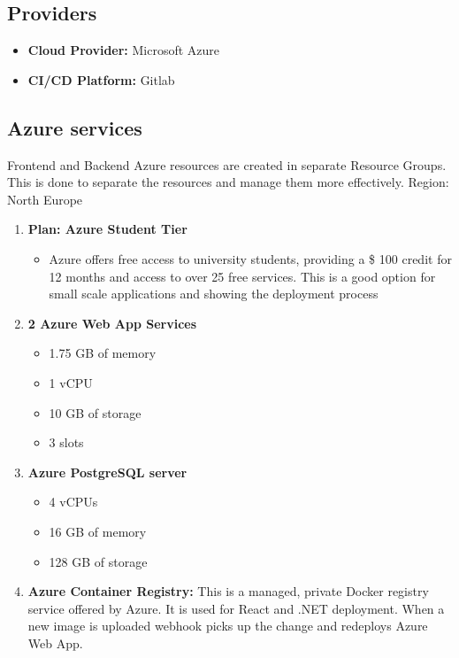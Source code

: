 \documentclass[
    english, %
]{VUMIFPSkursinis}
\begin{document}
\subsection{Providers}
\begin{itemize}
    \item \textbf{Cloud Provider:} Microsoft Azure
    \item \textbf{CI/CD Platform:} Gitlab
\end{itemize}

\subsection{Azure services}
Frontend and Backend Azure resources are created in separate Resource Groups. This is done to separate the resources and manage them more effectively. Region: North Europe
\begin{enumerate}
    \item \textbf{Plan: Azure Student Tier} 
        \begin{itemize}
            \item Azure offers free access to university students, providing a \$ 100 credit for 12 months and access to over 25 free services. This is a good option for small scale applications and showing the deployment process
        \end{itemize}
    \item \textbf{2 Azure Web App Services} 
        \begin{itemize} 
            \item 1.75 GB of memory 
            \item 1 vCPU 
            \item 10 GB of storage 
            \item 3 slots
        \end{itemize}
    \item \textbf{Azure PostgreSQL server}
        \begin{itemize}
            \item 4 vCPUs
            \item 16 GB of memory
            \item 128 GB of storage
        \end{itemize}
    \item \textbf{Azure Container Registry:} This is a managed, private Docker registry service offered by Azure. It is used for React and .NET deployment. When a new image is uploaded webhook picks up the change and redeploys Azure Web App.
\end{enumerate}
\end{document}
